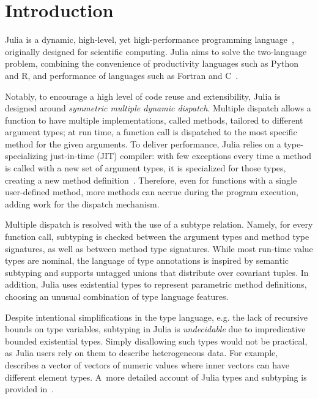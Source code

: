 \chapter{Introduction}

Julia is a dynamic, high-level, yet high-performance programming
language~\cite{bezanson:julia-fresh:2017},
originally designed for scientific computing.
Julia aims to solve the two-language problem, combining the convenience of
productivity languages such as Python and R, and performance of languages such
as Fortran and C~\cite{oopsla18a}.

Notably, to encourage a high level of code reuse and extensibility,
Julia is designed around \emph{symmetric multiple dynamic dispatch}.
Multiple dispatch allows a function to have multiple implementations, called
methods, tailored to different argument types; at run time, a function
call is dispatched to the most specific method for the given arguments.
To deliver performance, Julia relies on a type-specializing just-in-time (JIT)
compiler: with few exceptions%
every time a method is called with a new set of argument types,
it is specialized for those types, creating a new method
definition~\cite{oopsla21jules}.
Therefore, even for functions with a single user-defined method,
more methods can accrue during the program execution,
adding work for the dispatch mechanism.


Multiple dispatch is resolved with the use of a subtype relation.
Namely, for every function call, subtyping is checked between
the argument types and method type signatures,
as well as between method type signatures.
While most run-time value types are nominal,
the language of type annotations is inspired by semantic subtyping
and supports untagged unions that distribute over covariant tuples.
In addition, Julia uses existential types
to represent parametric method definitions,
choosing an unusual combination of type language features.

Despite intentional simplifications in the type language,
e.g. the lack of recursive bounds on type variables,
subtyping in Julia is \emph{undecidable} due to %
impredicative bounded existential types.
Simply disallowing such types would not be practical,
as Julia users rely on them to describe heterogeneous data.
For example, 
describes a vector of vectors of numeric values where inner vectors
can have different element types.
A~more detailed account of Julia types and subtyping
is provided in~.

